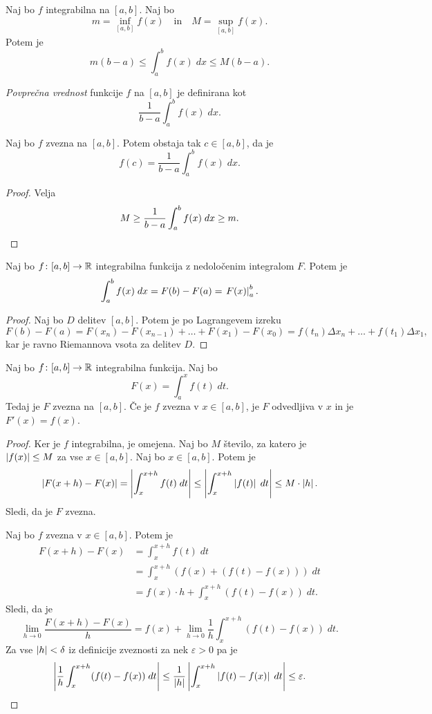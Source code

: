 \documentclass[12pt, a4paper]{article}
\begin{document}
\obvs

\begin{posledica}
Naj bo $f$ integrabilna na $[a,b]$. Naj bo
\[
m=\inf_{[a,b]} f(x)\quad\text{in}\quad M=\sup_{[a,b]} f(x).
\]
Potem je
\[
m(b-a)\leq \int_a^b f(x)\;dx\leq M(b-a).
\]
\end{posledica}

\obvs

\begin{definicija}
\emph{Povprečna vrednost} funkcije $f$ na $[a,b]$ je definirana kot
\[
\frac{1}{b-a}\int_a^b f(x)\;dx.
\]
\end{definicija}

\begin{izrek}
Naj bo $f$ zvezna na $[a,b]$. Potem obstaja tak $c\in[a,b]$, da je
\[
f(c)=\frac{1}{b-a}\int_a^b f(x)\;dx.
\]
\end{izrek}

\begin{proof}
Velja
\[
M\geq\frac{1}{b-a}\int_a^b f(x)\;dx\geq m.\qedhere
\]
\end{proof}

\begin{izrek}
Naj bo $f\colon[a,b]\to\mathbb{R}$ integrabilna funkcija z nedoločenim integralom $F$. Potem je
\[
\int_a^b f(x)\;dx=F(b)-F(a)=\left. F(x)\right|_{a}^{b}.
\]
\end{izrek}

\begin{proof}
Naj bo $D$ delitev $[a,b]$. Potem je po Lagrangevem izreku
\[
F(b)-F(a)=F(x_n)-F(x_{n-1})+\dots+F(x_1)-F(x_0)=f(t_n)\Delta x_n+\dots+f(t_1)\Delta x_1,
\]
kar je ravno Riemannova vsota za delitev $D$.
\end{proof}

\begin{izrek}
Naj bo $f\colon[a,b]\to\mathbb{R}$ integrabilna funkcija. Naj bo
\[
F(x)=\int_a^x f(t)\;dt.
\]
Tedaj je $F$ zvezna na $[a,b]$. Če je $f$ zvezna v $x\in[a,b]$, je $F$ odvedljiva v $x$ in je $F'(x)=f(x)$.
\end{izrek}

\begin{proof}
Ker je $f$ integrabilna, je omejena. Naj bo $M$ število, za katero je $\left\lvert f(x)\right\rvert\leq M$ za vse $x\in[a,b]$. Naj bo $x\in[a,b]$. Potem je
\[
\left\lvert F(x+h)-F(x)\right\rvert=\left\lvert \int_x^{x+h} f(t)\;dt\right\rvert\leq\left\lvert \int_x^{x+h}\left\lvert f(t)\right\rvert\;dt\right\rvert\leq M\cdot\left\lvert h\right\rvert.
\]
Sledi, da je $F$ zvezna.

Naj bo $f$ zvezna v $x\in[a,b]$. Potem je
\begin{align*}
F(x+h)-F(x)&=\int_x^{x+h} f(t)\;dt
\\
&=\int_x^{x+h} (f(x)+(f(t)-f(x)))\;dt
\\
&=f(x)\cdot h+\int_x^{x+h}(f(t)-f(x))\;dt.
\end{align*}
Sledi, da je
\[
\lim_{h\to 0}\frac{F(x+h)-F(x)}{h}=f(x)+\lim_{h\to 0}\frac{1}{h}\int_x^{x+h}(f(t)-f(x))\;dt.
\]
Za vse $\left\lvert h\right\rvert<\delta$ iz definicije zveznosti za nek $\varepsilon>0$ pa je
\[
\left\lvert \frac{1}{h}\int_x^{x+h}(f(t)-f(x))\;dt\right\rvert\leq\frac{1}{\left\lvert h\right\rvert}\left\lvert \int_x^{x+h}\left\lvert f(t)-f(x)\right\rvert\;dt\right\rvert\leq\varepsilon.\qedhere
\]
\end{proof}
\end{document}
